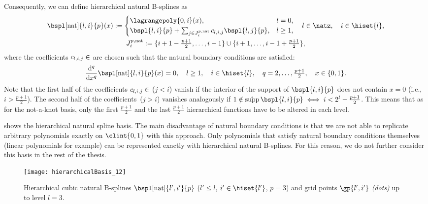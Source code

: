 Consequently, we can define hierarchical natural B-splines as
\begin{subequations}
  \begin{gather}
    \bspl[\ntrl]{l,i}{p}(x)
    :=
    \begin{cases}
      \lagrangepoly{0,i}(x),&
      l = 0,\\
      \bspl{l,i}{p} +
      \sum_{j \in J_i^{p,\ntrl}} c_{l,i,j} \bspl{l,j}{p},&
      l \ge 1,
    \end{cases}\quad
    l \in \natz,\quad
    i \in \hiset{l},\\
    J_i^{p,\ntrl}
    := \{i+1-\tfrac{p+1}{2}, \dotsc, i-1\} \cup
    \{i+1, \dotsc, i-1+\tfrac{p+1}{2}\},
  \end{gather}
\end{subequations}
where the coefficients $c_{l,i,j} \in \real$ are chosen such that
the natural boundary conditions are satisfied:
\begin{equation}
  \frac{\diff^q}{\dx^q} \bspl[\ntrl]{l,i}{p}(x)
  = 0,\quad
  l \ge 1,\quad
  i \in \hiset{l},\quad
  q = 2, \dotsc, \tfrac{p+1}{2},\quad
  x \in \{0, 1\}.
\end{equation}
Note that the first half of the coefficients $c_{l,i,j} \in \real$
($j < i$) vanish if the interior of the support of $\bspl{l,i}{p}$
does not contain $x = 0$
(i.e., $i > \tfrac{p+1}{2}$).
The second half of the coefficients~($j > i$) vanishes analogously
if $1 \notin \interiorsupp \bspl{l,i}{p} \iff i < 2^l - \tfrac{p+1}{2}$.
This means that as for the not-a-knot basis,
only the first $\tfrac{p+1}{2}$ and the last $\tfrac{p+1}{2}$
hierarchical functions have to be altered in each level.

 shows the hierarchical natural spline basis.
The main disadvantage of natural boundary conditions is that
we are not able to replicate arbitrary polynomials exactly on $\clint{0, 1}$
with this approach.
Only polynomials that satisfy natural boundary conditions themselves
(linear polynomials for example)
can be represented exactly with hierarchical natural B-splines.
For this reason, we do not further consider this basis in the
rest of the thesis.

\begin{SCfigure}
  \texttt{[image: hierarchicalBasis\_12]}%
  \caption[%
    Hierarchical natural B-splines%
  ]{%
    Hierarchical cubic natural B-splines
    $\bspl[\ntrl]{l',i'}{p}$
    ($l' \le l$, $i' \in \hiset{l'}$, $p = 3$) and
    grid points $\gp{l',i'}$ \emph{(dots)} up to level $l = 3$.%
  }%
  \label{fig:naturalBSpline}%
\end{SCfigure}
